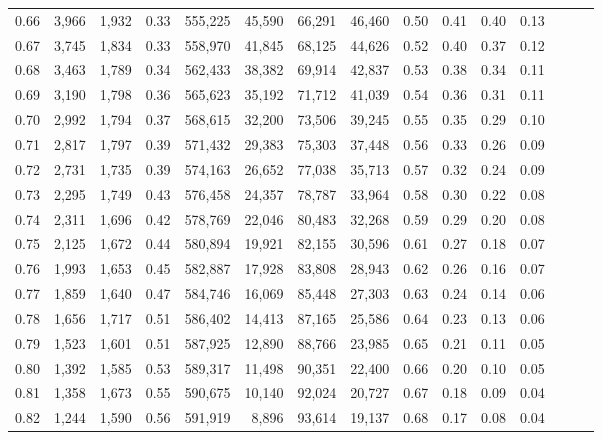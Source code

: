 \begin{tabular}{rrrrrrrrrrrrrrr}
0.66 &   3,966 &  1,932 &  0.33 &  555,225 &   45,590 &   66,291 &   46,460 &  0.50 &  0.41 &  0.40 &      0.13 \\
0.67 &   3,745 &  1,834 &  0.33 &  558,970 &   41,845 &   68,125 &   44,626 &  0.52 &  0.40 &  0.37 &      0.12 \\
0.68 &   3,463 &  1,789 &  0.34 &  562,433 &   38,382 &   69,914 &   42,837 &  0.53 &  0.38 &  0.34 &      0.11 \\
0.69 &   3,190 &  1,798 &  0.36 &  565,623 &   35,192 &   71,712 &   41,039 &  0.54 &  0.36 &  0.31 &      0.11 \\
0.70 &   2,992 &  1,794 &  0.37 &  568,615 &   32,200 &   73,506 &   39,245 &  0.55 &  0.35 &  0.29 &      0.10 \\
0.71 &   2,817 &  1,797 &  0.39 &  571,432 &   29,383 &   75,303 &   37,448 &  0.56 &  0.33 &  0.26 &      0.09 \\
0.72 &   2,731 &  1,735 &  0.39 &  574,163 &   26,652 &   77,038 &   35,713 &  0.57 &  0.32 &  0.24 &      0.09 \\
0.73 &   2,295 &  1,749 &  0.43 &  576,458 &   24,357 &   78,787 &   33,964 &  0.58 &  0.30 &  0.22 &      0.08 \\
0.74 &   2,311 &  1,696 &  0.42 &  578,769 &   22,046 &   80,483 &   32,268 &  0.59 &  0.29 &  0.20 &      0.08 \\
0.75 &   2,125 &  1,672 &  0.44 &  580,894 &   19,921 &   82,155 &   30,596 &  0.61 &  0.27 &  0.18 &      0.07 \\
0.76 &   1,993 &  1,653 &  0.45 &  582,887 &   17,928 &   83,808 &   28,943 &  0.62 &  0.26 &  0.16 &      0.07 \\
0.77 &   1,859 &  1,640 &  0.47 &  584,746 &   16,069 &   85,448 &   27,303 &  0.63 &  0.24 &  0.14 &      0.06 \\
0.78 &   1,656 &  1,717 &  0.51 &  586,402 &   14,413 &   87,165 &   25,586 &  0.64 &  0.23 &  0.13 &      0.06 \\
0.79 &   1,523 &  1,601 &  0.51 &  587,925 &   12,890 &   88,766 &   23,985 &  0.65 &  0.21 &  0.11 &      0.05 \\
0.80 &   1,392 &  1,585 &  0.53 &  589,317 &   11,498 &   90,351 &   22,400 &  0.66 &  0.20 &  0.10 &      0.05 \\
0.81 &   1,358 &  1,673 &  0.55 &  590,675 &   10,140 &   92,024 &   20,727 &  0.67 &  0.18 &  0.09 &      0.04 \\
0.82 &   1,244 &  1,590 &  0.56 &  591,919 &    8,896 &   93,614 &   19,137 &  0.68 &  0.17 &  0.08 &      0.04 \\

\end{tabular}

